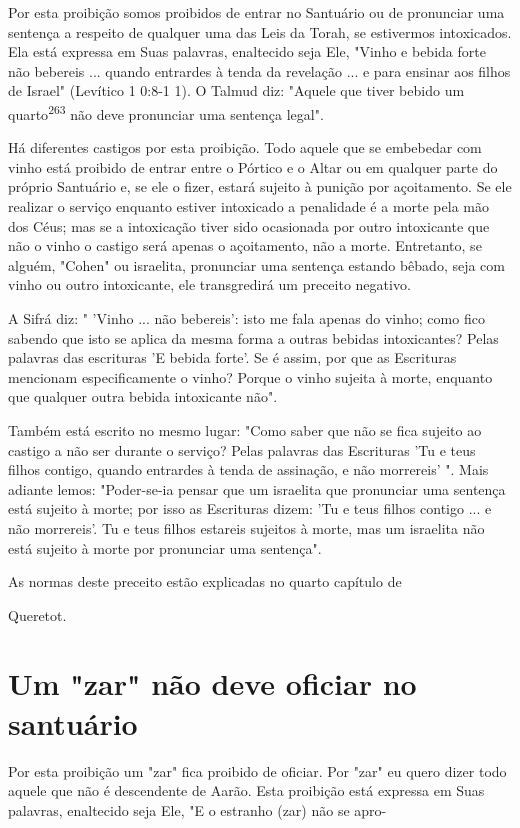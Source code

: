 \begin{itemize}
\begin{enumrate}
\begin{itemize}
\begin{itemize}
\begin{itemize}
Por esta proibição somos proibidos de entrar no Santuário ou de
pro­nunciar uma sentença a respeito de qualquer uma das Leis da Torah,
se estiver­mos intoxicados. Ela está expressa em Suas palavras,
enaltecido seja Ele, "Vi­nho e bebida forte não bebereis ... quando
entrardes à tenda da revelação ... e para ensinar aos filhos de Israel"
(Levítico 1 0:8-1 1). O Talmud diz: "Aquele que tiver bebido um
quarto\textsuperscript{263} não deve pronunciar uma sentença legal".

Há diferentes castigos por esta proibição. Todo aquele que se embe­bedar
com vinho está proibido de entrar entre o Pórtico e o Altar ou em
qual­quer parte do próprio Santuário e, se ele o fizer, estará sujeito à
punição por açoitamento. Se ele realizar o serviço enquanto estiver
intoxicado a penalidade é a morte pela mão dos Céus; mas se a
intoxicação tiver sido ocasionada por outro intoxicante que não o vinho
o castigo será apenas o açoitamento, não a morte. Entretanto, se alguém,
"Cohen" ou israelita, pronunciar uma senten­ça estando bêbado, seja com
vinho ou outro intoxicante, ele transgredirá um preceito negativo.

A Sifrá diz: " 'Vinho ... não bebereis': isto me fala apenas do vinho;
como fico sabendo que isto se aplica da mesma forma a outras bebidas
intoxi­cantes? Pelas palavras das escrituras 'E bebida forte'. Se é
assim, por que as Es­crituras mencionam especificamente o vinho? Porque
o vinho sujeita à morte, enquanto que qualquer outra bebida intoxicante
não".

Também está escrito no mesmo lugar: "Como saber que não se fica sujeito
ao castigo a não ser durante o serviço? Pelas palavras das Escrituras
'Tu e teus filhos contigo, quando entrardes à tenda de assinação, e não
morrereis' ". Mais adiante lemos: "Poder-se-ia pensar que um israelita
que pronunciar uma sentença está sujeito à morte; por isso as Escrituras
dizem: 'Tu e teus filhos con­tigo ... e não morrereis'. Tu e teus filhos
estareis sujeitos à morte, mas um israe­lita não está sujeito à morte
por pronunciar uma sentença".


As normas deste preceito estão explicadas no quarto capítulo de


Queretot.

\section{Um "zar" não deve oficiar no santuário}

Por esta proibição um "zar" fica proibido de oficiar. Por "zar" eu quero
dizer todo aquele que não é descendente de Aarão. Esta proibição está
expressa em Suas palavras, enaltecido seja Ele, "E o estranho (zar) não
se apro-


\end{itemize}
\end{itemize}
\end{itemize}
\end{enumrate}
\end{itemize}
